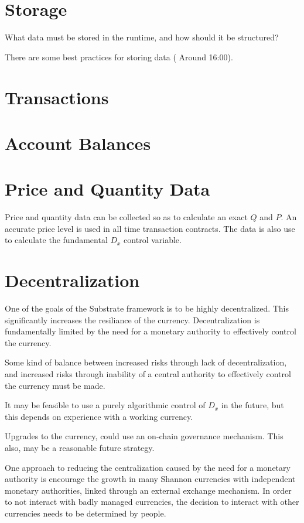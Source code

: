 \documentclass[a4paper]{book}
\begin{document}
\section{Storage}

What data must be stored in the runtime, and how should it be structured?

There are some best practices for storing data (\cite{tabrizi2019} Around 16:00).


\section{Transactions}


\section{Account Balances}

\section{Price and Quantity Data}

Price and quantity data can be collected so as to calculate an exact $Q$ and $P$. An accurate price
level is used in all time transaction contracts. The data is also use to calculate the fundamental
$D_x$ control variable. 

\section{Decentralization}

One of the goals of the Substrate framework is to be highly decentralized. This significantly
increases the resiliance of the currency. Decentralization is fundamentally limited by the need for
a monetary authority to effectively control the currency.

Some kind of balance between increased risks through lack of decentralization, and increased risks
through inability of a central authority to effectively control the currency must be made.

It may be feasible to use a purely algorithmic control of $D_x$ in the future, but this depends on
experience with a working currency.

Upgrades to the currency, could use an on-chain governance mechanism. This also, may be a reasonable
future strategy.

One approach to reducing the centralization caused by the need for a monetary authority is encourage
the growth in many Shannon currencies with independent monetary authorities, linked through an
external exchange mechanism. In order to not interact with badly managed currencies, the decision to
interact with other currencies needs to be determined by people.
\end{document}
